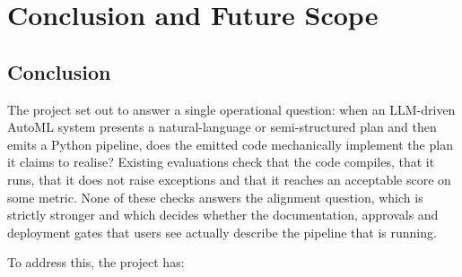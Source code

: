 \chapter{Conclusion and Future Scope}
\label{ch:conclusion}

\section{Conclusion}

The project set out to answer a single operational question: when an
LLM-driven AutoML system presents a natural-language or
semi-structured plan and then emits a Python pipeline, does the
emitted code mechanically implement the plan it claims to realise?
Existing evaluations check that the code compiles, that it runs,
that it does not raise exceptions and that it reaches an acceptable
score on some metric. None of these checks answers the alignment
question, which is strictly stronger and which decides whether the
documentation, approvals and deployment gates that users see
actually describe the pipeline that is running.

To address this, the project has:

